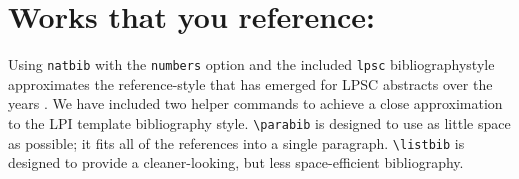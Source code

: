 \documentclass[twoside, 10pt]{article}
\begin{document}
\section*{Works that you reference:}

Using \texttt{natbib} with the \texttt{numbers} option and the included
\texttt{lpsc} bibliographystyle approximates the reference-style
that has emerged for LPSC abstracts over the years \citep{LPSC}. 
 We have included two helper commands to achieve a 
close approximation to the LPI template bibliography style.
\verb=\parabib= is designed to use as little space as possible; it fits all 
of the references into a single paragraph. \verb=\listbib= is designed to 
provide a cleaner-looking, but less space-efficient bibliography.


\end{document}
